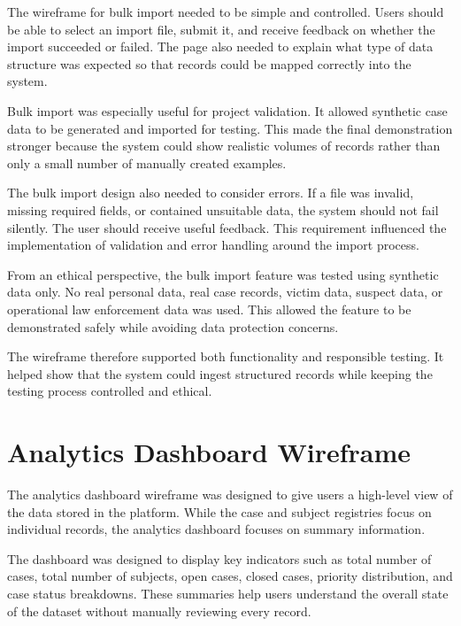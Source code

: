 The wireframe for bulk import needed to be simple and controlled. Users should be able to select an import file, submit it, and receive feedback on whether the import succeeded or failed. The page also needed to explain what type of data structure was expected so that records could be mapped correctly into the system.

Bulk import was especially useful for project validation. It allowed synthetic case data to be generated and imported for testing. This made the final demonstration stronger because the system could show realistic volumes of records rather than only a small number of manually created examples.

The bulk import design also needed to consider errors. If a file was invalid, missing required fields, or contained unsuitable data, the system should not fail silently. The user should receive useful feedback. This requirement influenced the implementation of validation and error handling around the import process.

From an ethical perspective, the bulk import feature was tested using synthetic data only. No real personal data, real case records, victim data, suspect data, or operational law enforcement data was used. This allowed the feature to be demonstrated safely while avoiding data protection concerns.

The wireframe therefore supported both functionality and responsible testing. It helped show that the system could ingest structured records while keeping the testing process controlled and ethical.


\section{Analytics Dashboard Wireframe}

The analytics dashboard wireframe was designed to give users a high-level view of the data stored in the platform. While the case and subject registries focus on individual records, the analytics dashboard focuses on summary information.

The dashboard was designed to display key indicators such as total number of cases, total number of subjects, open cases, closed cases, priority distribution, and case status breakdowns. These summaries help users understand the overall state of the dataset without manually reviewing every record.

